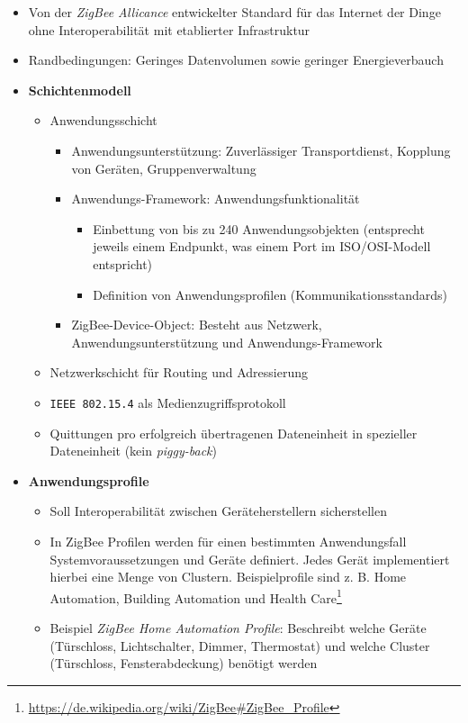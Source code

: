 \begin{itemize}
\begin{itemize}
		\item Von der \textit{ZigBee Allicance} entwickelter Standard für das Internet der Dinge ohne Interoperabilität mit etablierter Infrastruktur
		\item Randbedingungen: Geringes Datenvolumen sowie geringer Energieverbauch
		\item \textbf{Schichtenmodell}
		\begin{itemize}
			\item Anwendungsschicht
			\begin{itemize}
				\item Anwendungsunterstützung: Zuverlässiger Transportdienst, Kopplung von Geräten, Gruppenverwaltung
				\item Anwendungs-Framework: Anwendungsfunktionalität
				\begin{itemize}
					\item Einbettung von bis zu 240 Anwendungsobjekten (entsprecht jeweils einem Endpunkt, was einem Port im ISO/OSI-Modell entspricht)
					\item Definition von Anwendungsprofilen (Kommunikationsstandards)
				\end{itemize}
				\item ZigBee-Device-Object: Besteht aus Netzwerk, Anwendungsunterstützung und Anwendungs-Framework
			\end{itemize}
			\item Netzwerkschicht für Routing und Adressierung
			\item \texttt{IEEE 802.15.4} als Medienzugriffsprotokoll
			\item Quittungen pro erfolgreich übertragenen Dateneinheit in spezieller Dateneinheit (kein \textit{piggy-back})
		\end{itemize}
		\item \textbf{Anwendungsprofile}
		\begin{itemize}
			\item Soll Interoperabilität zwischen Geräteherstellern sicherstellen
			\item In ZigBee Profilen werden für einen bestimmten Anwendungsfall Systemvoraussetzungen und Geräte definiert. Jedes Gerät implementiert hierbei eine Menge von Clustern. Beispielprofile sind z. B. Home Automation, Building Automation und Health Care\footnote{\url{https://de.wikipedia.org/wiki/ZigBee\#ZigBee_Profile}}
			\item Beispiel \textit{ZigBee Home Automation Profile}: Beschreibt welche Geräte (Türschloss, Lichtschalter, Dimmer, Thermostat) und welche Cluster (Türschloss, Fensterabdeckung) benötigt werden

\end{itemize}
\end{itemize}
\end{itemize}
